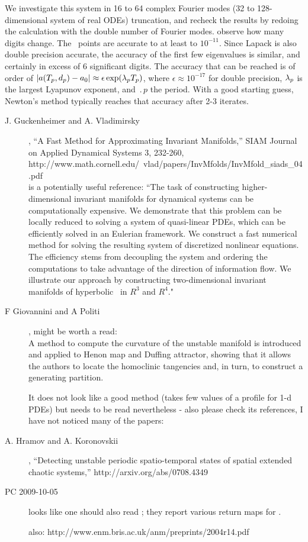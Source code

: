  We investigate this system in 16 to 64 complex Fourier modes (32 to
128-dimensional system of real ODEs) truncation, and recheck the results
by redoing the calculation with the double number of Fourier modes. %
observe how many digits change. The \eqv\ points are accurate to at least
to $10^{-11}$. Since Lapack is also double precision accurate, the
accuracy of the first few eigenvalues is similar, and certainly in excess
of 6 significant digits. %
The accuracy that can be reached is of order of
$|a({T_{p}},d_p) - a_0|
 \approx \epsilon \exp(\lambda_p {T_{p}})$,
 where $\epsilon \approx 10^{-17}$ for double precision, $\lambda_p$ is
the largest Lyapunov exponent, and $\period{p}$ the period.  With a good
starting guess, Newton's method typically reaches that accuracy after 2-3
iterates.

\begin{description}
\item[J. Guckenheimer and A. Vladimirsky],
``A Fast Method for Approximating Invariant Manifolds,''
SIAM Journal on Applied Dynamical Systems
3, 232-260,
\\
http://www.math.cornell.edu/~vlad/papers/InvMfolds/InvMfold\_siads\_04.pdf
\\
is a potentially useful reference:
``The task of constructing higher-dimensional invariant
manifolds for dynamical systems can be computationally
expensive. We demonstrate that this problem can be locally
reduced to solving a system of quasi-linear PDEs, which can be
efficiently solved in an Eulerian framework. We construct a
fast numerical method for solving the resulting system of
discretized nonlinear equations. The efficiency stems from
decoupling the system and ordering the computations to take
advantage of the direction of information flow. We illustrate
our approach by constructing two-dimensional invariant
manifolds of hyperbolic \eqva\ in $R^3$ and $R^4$."

\item[F Giovannini and A Politi], might be worth a read:
\\
A method to compute the curvature of the unstable manifold is
introduced and applied to Henon map and Duffing attractor,
showing that it allows the authors to locate the homoclinic
tangencies and, in turn, to construct a generating partition.

It does not look like a good method (takes few values of a profile
for 1-d PDEs) but needs to be read nevertheless - also please
check its references, I have not noticed many of the papers:

\item[A. Hramov and A. Koronovskii],
``Detecting unstable periodic spatio-temporal states of spatial
extended chaotic systems,''
http://arxiv.org/abs/0708.4349

\item[PC 2009-10-05]
looks like one should also read ; they
report various return maps for \cLe.

\item[]
also:
http://www.enm.bris.ac.uk/anm/preprints/2004r14.pdf

\end{description}


